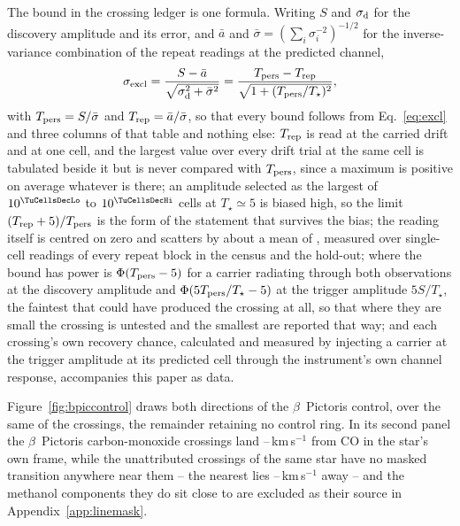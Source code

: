 The bound in the crossing ledger is one formula. Writing $S$ and
$\sigma_{\rm d}$ for the discovery amplitude and its error, and $\bar{a}$ and
$\bar{\sigma}=(\sum_i\sigma_i^{-2})^{-1/2}$ for the inverse-variance
combination of the repeat readings at the predicted channel,
\begin{equation}
\sigma_{\rm excl}=\frac{S-\bar{a}}
{\sqrt{\sigma_{\rm d}^{2}+\bar{\sigma}^{2}}}
=\frac{T_{\rm pers}-T_{\rm rep}}{\sqrt{1+(T_{\rm pers}/T_\star)^{2}}},
\label{eq:excl}
\end{equation}
with $T_{\rm pers}=S/\bar{\sigma}$ and $T_{\rm rep}=\bar{a}/\bar{\sigma}$, so
that every bound follows from Eq.~\ref{eq:excl} and three columns of that
table and nothing else: $T_{\rm rep}$ is read at the carried drift and at one
cell, and the largest value over every drift trial at the same cell is
tabulated beside it but is never compared with $T_{\rm pers}$, since a maximum
is positive on average whatever is there; an amplitude selected as the largest
of $10^{\TuCellsDecLo}$ to $10^{\TuCellsDecHi}$ cells at $T_\star\simeq5$ is
biased high, so the limit $(T_{\rm rep}+5)/T_{\rm pers}$ is the form of the
statement that survives the bias; the reading itself is centred on zero and
scatters by \NuNullSd{} about a mean of \NuNullMean, measured over \NuNullN{}
single-cell readings of every repeat block in the census and the hold-out;
where the bound has power is $\Phi(T_{\rm pers}-5)$ for a carrier radiating
through both observations at the discovery amplitude and
$\Phi(5T_{\rm pers}/T_\star-5)$ at the trigger amplitude $5S/T_\star$, the
faintest that could have produced the crossing at all, so that where they are
small the crossing is untested and the \HjNPowerLo{} smallest are reported
that way; and each crossing's own recovery chance, calculated and measured by
injecting a carrier at the trigger amplitude at its predicted cell through the
instrument's own channel response, accompanies this paper as data.

Figure~\ref{fig:bpiccontrol} draws both directions of the $\beta$~Pictoris
control, over the same \BpicPanelNDrawn{} of the \NCross{} crossings, the
remainder retaining no control ring. In its second panel the
\BpicPanelNCo{} $\beta$~Pictoris carbon-monoxide crossings land
\BpicDvCoLo--\BpicDvCoHi\,km\,s$^{-1}$ from CO in the star's own frame,
while the \BpicPanelNCs{} unattributed crossings of the same star have no
masked transition anywhere near them -- the nearest lies
\BpicDvCsLo--\BpicDvCsHi\,km\,s$^{-1}$ away -- and the methanol components
they do sit close to are excluded as their source in
Appendix~\ref{app:linemask}.


